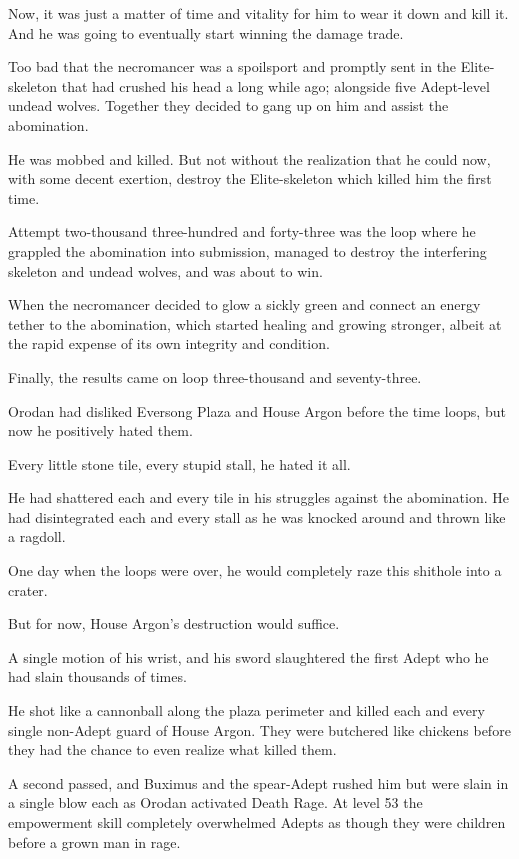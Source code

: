 \documentclass[a4paper,10pt]{book}
\begin{document}
Now, it was just a matter of time and vitality for him to wear it down and kill it. And he was going to eventually start winning the damage trade.\par
Too bad that the necromancer was a spoilsport and promptly sent in the Elite-skeleton that had crushed his head a long while ago; alongside five Adept-level undead wolves. Together they decided to gang up on him and assist the abomination.\par
He was mobbed and killed. But not without the realization that he could now, with some decent exertion, destroy the Elite-skeleton which killed him the first time.\par
Attempt two-thousand three-hundred and forty-three was the loop where he grappled the abomination into submission, managed to destroy the interfering skeleton and undead wolves, and was about to win.\par
When the necromancer decided to glow a sickly green and connect an energy tether to the abomination, which started healing and growing stronger, albeit at the rapid expense of its own integrity and condition.\par
Finally, the results came on loop three-thousand and seventy-three.\par
\par
Orodan had disliked Eversong Plaza and House Argon before the time loops, but now he positively hated them.\par
Every little stone tile, every stupid stall, he hated it all.\par
He had shattered each and every tile in his struggles against the abomination. He had disintegrated each and every stall as he was knocked around and thrown like a ragdoll.\par
One day when the loops were over, he would completely raze this shithole into a crater.\par
But for now, House Argon’s destruction would suffice.\par
A single motion of his wrist, and his sword slaughtered the first Adept who he had slain thousands of times.\par
He shot like a cannonball along the plaza perimeter and killed each and every single non-Adept guard of House Argon. They were butchered like chickens before they had the chance to even realize what killed them.\par
A second passed, and Buximus and the spear-Adept rushed him but were slain in a single blow each as Orodan activated Death Rage. At level 53 the empowerment skill completely overwhelmed Adepts as though they were children before a grown man in rage.\par
\end{document}
